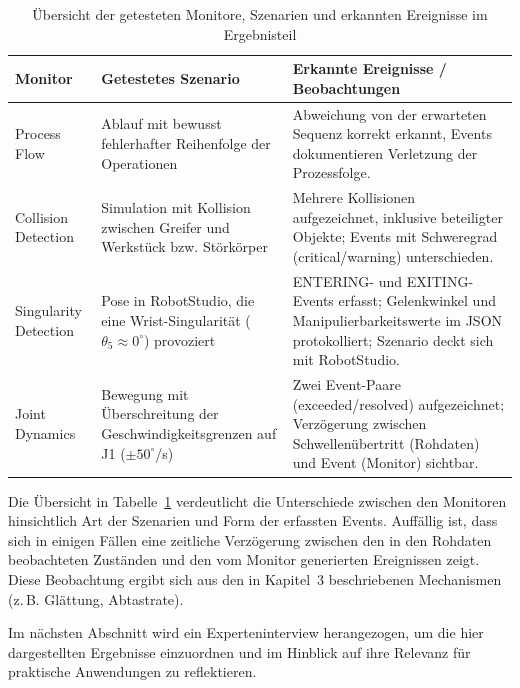 \begin{table}[H]
	\centering
	\small
	\begin{tabularx}{\textwidth}{lXX}
		\toprule
		\textbf{Monitor}      & \textbf{Getestetes Szenario}                                                               & \textbf{Erkannte Ereignisse / Beobachtungen}                                                                                               \\
		\midrule
		Process Flow          & Ablauf mit bewusst fehlerhafter Reihenfolge der Operationen                                & Abweichung von der erwarteten Sequenz korrekt erkannt, Events dokumentieren Verletzung der Prozessfolge.                                   \\
		\addlinespace
		Collision Detection   & Simulation mit Kollision zwischen Greifer und Werkstück bzw. Störkörper                    & Mehrere Kollisionen aufgezeichnet, inklusive beteiligter Objekte; Events mit Schweregrad (critical/warning) unterschieden.                 \\
		\addlinespace
		Singularity Detection & Pose in RobotStudio, die eine Wrist-Singularität ($\theta_{5} \approx 0^\circ$) provoziert & ENTERING- und EXITING-Events erfasst; Gelenkwinkel und Manipulierbarkeitswerte im JSON protokolliert; Szenario deckt sich mit RobotStudio. \\
		\addlinespace
		Joint Dynamics        & Bewegung mit Überschreitung der Geschwindigkeitsgrenzen auf J1 ($\pm 50^\circ$/s)          & Zwei Event-Paare (exceeded/resolved) aufgezeichnet; Verzögerung zwischen Schwellenübertritt (Rohdaten) und Event (Monitor) sichtbar.       \\
		\bottomrule
	\end{tabularx}
	\caption{Übersicht der getesteten Monitore, Szenarien und erkannten Ereignisse im Ergebnisteil}
	\label{tab:monitor_overview}
\end{table}

\noindent
Die Übersicht in Tabelle~\ref{tab:monitor_overview} verdeutlicht die Unterschiede
zwischen den Monitoren hinsichtlich Art der Szenarien und Form der erfassten Events.
Auffällig ist, dass sich in einigen Fällen eine zeitliche Verzögerung zwischen
den in den Rohdaten beobachteten Zuständen und den vom Monitor generierten
Ereignissen zeigt. Diese Beobachtung ergibt sich aus den in Kapitel~3 beschriebenen
Mechanismen (z.\,B. Glättung, Abtastrate).

Im nächsten Abschnitt wird ein Experteninterview herangezogen, um die hier
dargestellten Ergebnisse einzuordnen und im Hinblick auf ihre Relevanz für
praktische Anwendungen zu reflektieren.
